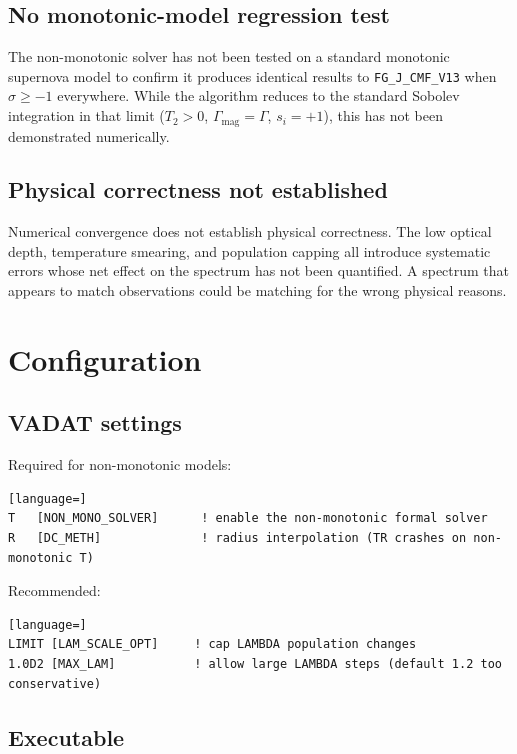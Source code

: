\documentclass[11pt,a4paper]{article}
\begin{document}
\subsection{No monotonic-model regression test}

The non-monotonic solver has not been tested on a standard monotonic
supernova model to confirm it produces identical results to
\texttt{FG\_J\_CMF\_V13} when $\sigma \geq -1$ everywhere.  While the
algorithm reduces to the standard Sobolev integration in that limit
($T_2 > 0$, $\Gamma_{\mathrm{mag}} = \Gamma$, $s_i = +1$), this has not
been demonstrated numerically.

\subsection{Physical correctness not established}

Numerical convergence does not establish physical correctness.  The low
optical depth, temperature smearing, and population capping all
introduce systematic errors whose net effect on the spectrum has not
been quantified.  A spectrum that appears to match observations could
be matching for the wrong physical reasons.

\section{Configuration}

\subsection{VADAT settings}

Required for non-monotonic models:
\begin{lstlisting}[language=]
T   [NON_MONO_SOLVER]      ! enable the non-monotonic formal solver
R   [DC_METH]              ! radius interpolation (TR crashes on non-monotonic T)
\end{lstlisting}

Recommended:
\begin{lstlisting}[language=]
LIMIT [LAM_SCALE_OPT]     ! cap LAMBDA population changes
1.0D2 [MAX_LAM]           ! allow large LAMBDA steps (default 1.2 too conservative)
\end{lstlisting}

\subsection{Executable}
\end{document}
